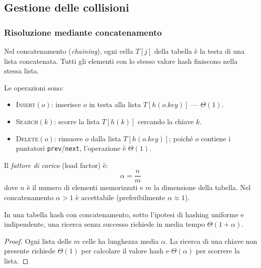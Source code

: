 \subsection{Gestione delle collisioni}

\subsubsection{Risoluzione mediante concatenamento}

\begin{softnote}
	Nel concatenamento (\emph{chaining}), ogni cella $T[j]$ della tabella è la
	testa di una lista concatenata. Tutti gli elementi con lo stesso valore hash
	finiscono nella stessa lista.
\end{softnote}

Le operazioni sono:
\begin{itemize}
	\item \textsc{Insert}$(o)$: inserisce $o$ in testa alla lista
	$T[h(o.\mathit{key})]$ --- $\Theta(1)$.
	\item \textsc{Search}$(k)$: scorre la lista $T[h(k)]$ cercando la chiave
	$k$.
	\item \textsc{Delete}$(o)$: rimuove $o$ dalla lista
	$T[h(o.\mathit{key})]$; poiché $o$ contiene i puntatori
	\texttt{prev}/\texttt{next}, l'operazione è $\Theta(1)$.
\end{itemize}

\begin{definizione}
	Il \emph{fattore di carico} (load factor) è:
	\[
	\alpha = \frac{n}{m}
	\]
	dove $n$ è il numero di elementi memorizzati e $m$ la dimensione della
	tabella. Nel concatenamento $\alpha > 1$ è accettabile (preferibilmente
	$\alpha \approx 1$).
\end{definizione}

\begin{teorema}
	In una tabella hash con concatenamento, sotto l'ipotesi di hashing uniforme
	e indipendente, una ricerca senza successo richiede in media tempo
	$\Theta(1 + \alpha)$.
\end{teorema}

\begin{proof}
	Ogni lista delle $m$ celle ha lunghezza media $\alpha$. La ricerca di una
	chiave non presente richiede $\Theta(1)$ per calcolare il valore hash e
	$\Theta(\alpha)$ per scorrere la lista.
\end{proof}

